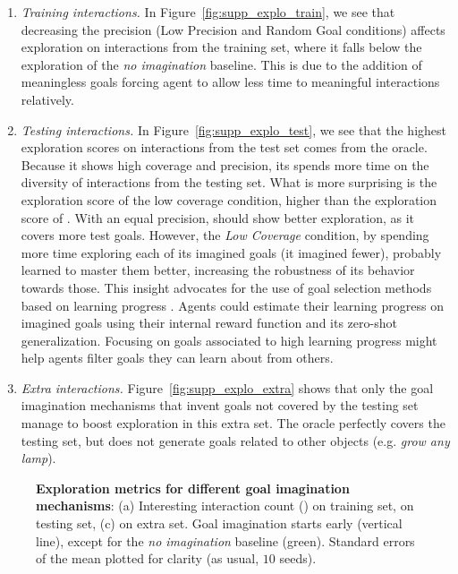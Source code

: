\begin{enumerate}
    \item \textit{Training interactions.} In Figure~\ref{fig:supp_explo_train}, we see that decreasing the precision (Low Precision and Random Goal conditions) affects exploration on interactions from the training set, where it falls below the exploration of the \textit{no imagination} baseline. This is due to the addition of meaningless goals forcing agent to allow less time to meaningful interactions relatively.
    \item \textit{Testing interactions.}
    In Figure~\ref{fig:supp_explo_test}, we see that the highest exploration scores on interactions from the test set comes from the oracle. Because it shows high coverage and precision, its spends more time on the diversity of interactions from the testing set. What is more surprising is the exploration score of the low coverage condition, higher than the exploration score of \CGH. With an equal precision, \CGH should show better exploration, as it covers more test goals. However, the \textit{Low Coverage} condition, by spending more time exploring each of its imagined goals (it imagined fewer), probably learned to master them better, increasing the robustness of its behavior towards those. This insight advocates for the use of goal selection methods based on learning progress \cite{forestier2016modular,curious}. Agents could estimate their learning progress on imagined goals using their internal reward function and its zero-shot generalization. Focusing on goals associated to high learning progress might help agents filter goals they can learn about from others.
    
    \item \textit{Extra interactions.} Figure~\ref{fig:supp_explo_extra} shows that only the goal imagination mechanisms that invent goals not covered by the testing set manage to boost exploration in this extra set. The oracle perfectly covers the testing set, but does not generate goals related to other objects (e.g. \textit{grow any lamp}). 
\end{enumerate} 


\begin{figure*}[!h]
  \centering
  \caption{\textbf{Exploration metrics for different goal imagination mechanisms}: (a) Interesting interaction count (\itwoc) on training set, \itwoc on testing set, (c) \itwoc on extra set.  Goal imagination starts early (vertical line), except for the \textit{no imagination} baseline (green). Standard errors of the mean plotted for clarity (as usual, $10$ seeds).}
  \label{fig:suppl_explo_metrics_goalim}
\end{figure*}   

